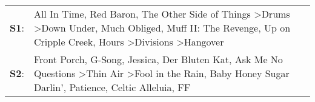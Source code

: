 \begin{supertabular}{p{0.03\textwidth}p{0.92\textwidth}}
 \textbf{S1}:  &  All In Time\textsuperscript{}, \enspace Red Baron\textsuperscript{}, \enspace The Other Side of Things\textsuperscript{} \textgreater \enspace Drums\textsuperscript{} \textgreater \enspace Down Under\textsuperscript{}, \enspace Much Obliged\textsuperscript{}, \enspace Muff II: The Revenge\textsuperscript{}, \enspace Up on Cripple Creek\textsuperscript{}, \enspace Hours\textsuperscript{} \textgreater \enspace Divisions\textsuperscript{} \textgreater \enspace Hangover\textsuperscript{}  \enspace  \\
 \textbf{S2}:  &                            Front Porch\textsuperscript{}, \enspace G-Song\textsuperscript{}, \enspace Jessica\textsuperscript{}, \enspace Der Bluten Kat\textsuperscript{}, \enspace Ask Me No Questions\textsuperscript{} \textgreater \enspace Thin Air\textsuperscript{} \textgreater \enspace Fool in the Rain\textsuperscript{}, \enspace Baby Honey Sugar Darlin'\textsuperscript{}, \enspace Patience\textsuperscript{}, \enspace Celtic Alleluia\textsuperscript{}, \enspace FF\textsuperscript{}  \enspace  \\
\end{supertabular}
